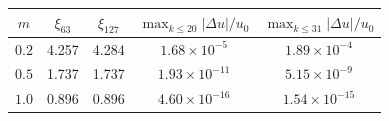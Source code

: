 \begin{tabular}{ccccc}
\toprule
$m$ & $\xi_{63}$ & $\xi_{127}$ & $\max_{k\le20}|\Delta u|/u_0$ & $\max_{k\le31}|\Delta u|/u_0$ \\
\midrule
$0.2$ & 4.257 & 4.284 & $1.68\times10^{-5}$ & $1.89\times10^{-4}$ \\
$0.5$ & 1.737 & 1.737 & $1.93\times10^{-11}$ & $5.15\times10^{-9}$ \\
$1.0$ & 0.896 & 0.896 & $4.60\times10^{-16}$ & $1.54\times10^{-15}$ \\
\bottomrule
\end{tabular}
